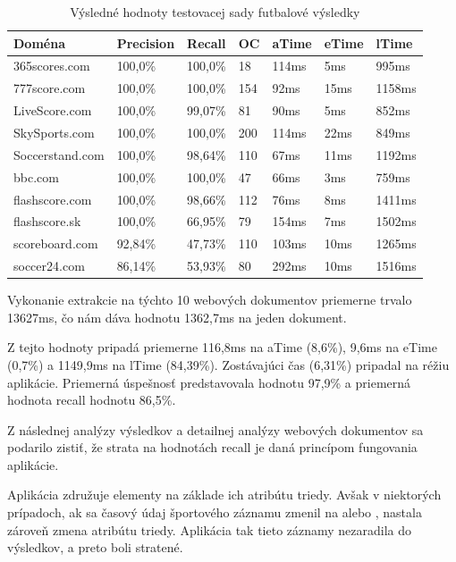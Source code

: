 \begin{table}[hbt]
\caption{Výsledné hodnoty testovacej sady futbalové výsledky}
\centering
\begin{tabular}{|l|l|l|l|l|l|l|}
\hline
\textbf{Doména}          & \textbf{Precision} & \textbf{Recall}  & \textbf{OC}  & \textbf{aTime} & \textbf{eTime} & \textbf{lTime}  \\ \hline
365scores.com   & 100,0\%   & 100,0\% & 18  & 114ms & 5ms   & 995ms  \\ \hline
777score.com    & 100,0\%   & 100,0\% & 154 & 92ms  & 15ms  & 1158ms \\ \hline
LiveScore.com   & 100,0\%   & 99,07\% & 81  & 90ms  & 5ms   & 852ms  \\ \hline
SkySports.com   & 100,0\%   & 100,0\% & 200 & 114ms & 22ms  & 849ms  \\ \hline
Soccerstand.com & 100,0\%   & 98,64\% & 110 & 67ms  & 11ms  & 1192ms \\ \hline
bbc.com         & 100,0\%   & 100,0\% & 47  & 66ms  & 3ms   & 759ms  \\ \hline
flashscore.com  & 100,0\%   & 98,66\% & 112 & 76ms  & 8ms   & 1411ms \\ \hline
flashscore.sk   & 100,0\%   & 66,95\% & 79  & 154ms & 7ms   & 1502ms \\ \hline
scoreboard.com  & 92,84\%   & 47,73\% & 110 & 103ms & 10ms  & 1265ms \\ \hline
soccer24.com    & 86,14\%   & 53,93\% & 80  & 292ms & 10ms  & 1516ms \\ \hline
\end{tabular}
\end{table}

Vykonanie extrakcie na týchto 10 webových dokumentov priemerne trvalo 13627ms, čo nám dáva hodnotu 1362,7ms na jeden dokument. 

Z tejto hodnoty pripadá priemerne 116,8ms na aTime (8,6\%), 9,6ms na eTime (0,7\%) a 1149,9ms na lTime (84,39\%). Zostávajúci čas (6,31\%) pripadal na réžiu aplikácie. Priemerná úspešnosť predstavovala hodnotu 97,9\% a priemerná hodnota recall hodnotu 86,5\%. 

\bigskip

Z následnej analýzy výsledkov a detailnej analýzy webových dokumentov sa podarilo zistiť, že strata na hodnotách recall je daná princípom fungovania aplikácie.

Aplikácia združuje elementy na základe ich atribútu triedy. Avšak v niektorých prípadoch, ak sa časový údaj športového záznamu zmenil na  alebo ,  nastala zároveň zmena atribútu triedy. Aplikácia tak tieto záznamy nezaradila do výsledkov, a preto boli stratené.

